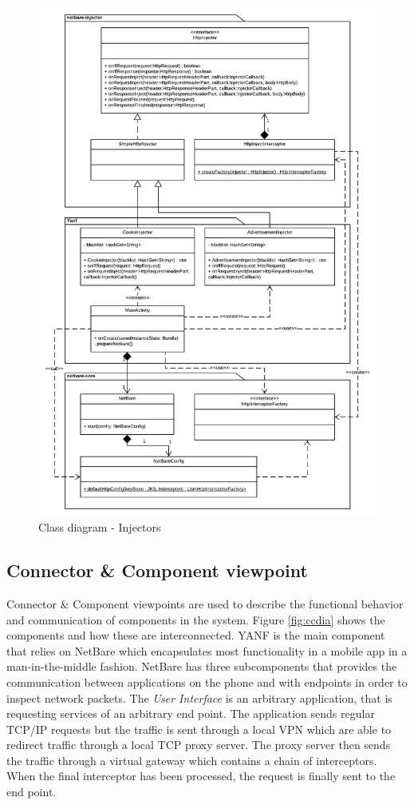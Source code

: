 \documentclass[main.tex]{subfiles}
\begin{document}
\begin{figure}[H]
    \centering
    \includegraphics[width=1\textwidth]{Images/Diagrams/Class-diagram-injectors.png}
    \caption{Class diagram - Injectors}
    \label{fig:modview-injector}
\end{figure}


\subsection{Connector \& Component viewpoint}
Connector \& Component viewpoints are used to describe the functional behavior and communication of components in the system. Figure \ref{fig:ccdia} shows the components and how these are interconnected. YANF is the main component that relies on NetBare which encapsulates most functionality in a mobile app in a man-in-the-middle fashion. NetBare has three subcomponents that provides the communication between applications on the phone and with endpoints in order to inspect network packets. The \textit{User Interface} is an arbitrary application, that is requesting services of an arbitrary end point. The application sends regular TCP/IP requests but the traffic is sent through a local VPN which are able to redirect traffic through a local TCP proxy server. The proxy server then sends the traffic through a virtual gateway which contains a chain of interceptors. When the final interceptor has been processed, the request is finally sent to the end point.
\end{document}
